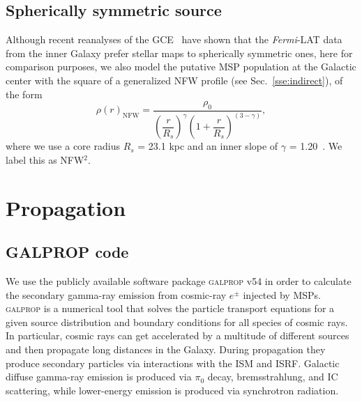 \documentclass[doublespace,nopageskip]{VTthesis}
\begin{document}
\subsection{Spherically symmetric source}\label{sec:NFW}

Although recent reanalyses of the GCE~\cite{2018NatAs...2..387M,2018NatAs...2..819B} have shown that the \textit{Fermi}-LAT data from the inner Galaxy prefer stellar maps to spherically symmetric ones, here for comparison purposes, we also model the putative MSP population at the Galactic center with the square of a generalized NFW profile (see Sec.~\ref{sse:indirect}), of the form
\begin{equation}\label{eq:NFW_2}
  \rho(r)_\mathrm{NFW} = \dfrac{\rho_0}{\left(\dfrac{r}{R_s}\right)^\gamma\left(1+\dfrac{r}{R_s}\right)^{(3-\gamma)}},
\end{equation}
where we use a core radius $R_s$ = 23.1 kpc
and an inner slope of $\gamma$ = 1.20~\cite{2012PhRvD..86h3511A,2014PhRvD..89f3515M}. We label this as NFW$^2$.

\section{Propagation}\label{sec:prop}

\subsection{GALPROP code}\label{sec:galprop}

We use the publicly available software package \textsc{galprop} v54 in order to calculate the secondary gamma-ray emission from cosmic-ray $e^\pm$ injected by MSPs. \textsc{galprop} is a numerical tool that solves the particle transport equations for a given source distribution and boundary conditions for all species of cosmic rays. In particular, cosmic rays can get accelerated by a multitude of different sources and then propagate long distances in the Galaxy. During propagation they produce secondary particles via interactions with the ISM and ISRF. Galactic diffuse gamma-ray emission is produced via $\pi_0$ decay, bremsstrahlung, and IC scattering, while lower-energy emission is produced via synchrotron radiation.
\end{document}
